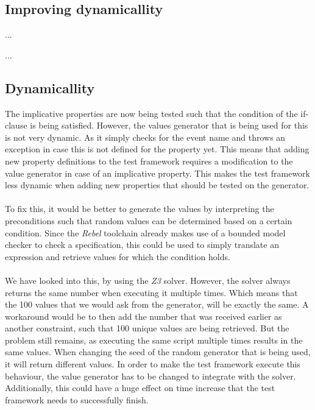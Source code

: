 \subsection{Improving dynamicallity}
...

...

\subsection*{Dynamicallity}
The implicative properties are now being tested such that the condition of the
if-clause is being satisfied. However, the values generator that is being used
for this is not very dynamic. As it simply checks for the event name and throws
an exception in case this is not defined for the property yet. This means that
adding new property definitions to the test framework requires a modification to
the value generator in case of an implicative property. This makes the test
framework less dynamic when adding new properties that should be tested on the
generator.\\
\\
To fix this, it would be better to generate the values by interpreting the
preconditions such that random values can be determined based on a certain
condition. Since the \textit{Rebel} toolchain already makes use of a bounded
model checker to check a specification, this could be used to simply translate
an expression and retrieve values for which the condition holds.\\
\\
We have looked into this, by using the \textit{Z3} solver. However, the solver
always returns the same number when executing it multiple times. Which means
that the 100 values that we would ask from the generator, will be exactly the
same. A workaround would be to then add the number that was received earlier as
another constraint, such that 100 unique values are being retrieved. But the
problem still remains, as executing the same script multiple times results in
the same values. When changing the seed of the random generator that is being
used, it will return different values. In order to make the test framework
execute this behaviour, the value generator has to be changed to integrate with
the solver. Additionally, this could have a huge effect on time increase that
the test framework needs to successfully finish.\\
\\






